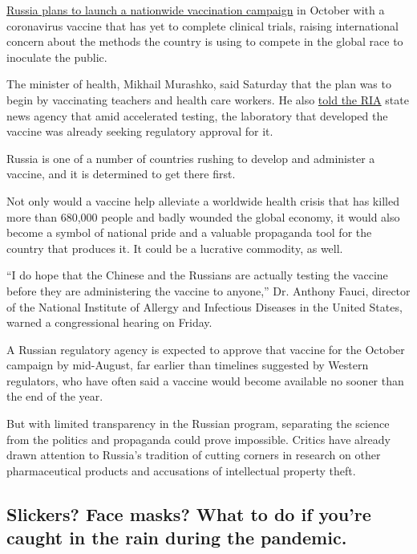 \href{https://www.nytimes.com/2020/08/02/world/europe/russia-trials-vaccine-October.html}{Russia
plans to launch a nationwide vaccination campaign} in October with a
coronavirus vaccine that has yet to complete clinical trials, raising
international concern about the methods the country is using to compete
in the global race to inoculate the public.

The minister of health, Mikhail Murashko, said Saturday that the plan
was to begin by vaccinating teachers and health care workers. He also
\href{https://ria.ru/20200801/1575248763.html}{told the RIA} state news
agency that amid accelerated testing, the laboratory that developed the
vaccine was already seeking regulatory approval for it.

Russia is one of a number of countries rushing to develop and administer
a vaccine, and it is determined to get there first.

Not only would a vaccine help alleviate a worldwide health crisis that
has killed more than 680,000 people and badly wounded the global
economy, it would also become a symbol of national pride and a valuable
propaganda tool for the country that produces it. It could be a
lucrative commodity, as well.

``I do hope that the Chinese and the Russians are actually testing the
vaccine before they are administering the vaccine to anyone,'' Dr.
Anthony Fauci, director of the National Institute of Allergy and
Infectious Diseases in the United States, warned a congressional hearing
on Friday.

A Russian regulatory agency is expected to approve that vaccine for the
October campaign by mid-August, far earlier than timelines suggested by
Western regulators, who have often said a vaccine would become available
no sooner than the end of the year.

But with limited transparency in the Russian program, separating the
science from the politics and propaganda could prove impossible. Critics
have already drawn attention to Russia's tradition of cutting corners in
research on other pharmaceutical products and accusations of
intellectual property theft.

\hypertarget{slickers-face-masks-what-to-do-if-youre-caught-in-the-rain-during-the-pandemic}{%
\subsection{Slickers? Face masks? What to do if you're caught in the
rain during the
pandemic.}\label{slickers-face-masks-what-to-do-if-youre-caught-in-the-rain-during-the-pandemic}}

